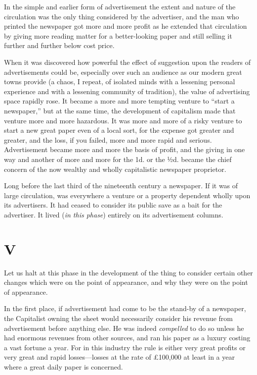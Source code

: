 \documentclass{book}
\begin{document}
In the simple and earlier form of advertisement the extent and nature of the circulation was the only thing considered by the advertiser, and the man who printed the newspaper got more and more profit as he extended that circulation by giving more reading matter for a better-looking paper and still selling it further and further below cost price.

When it was discovered how powerful the effect of suggestion upon the readers of advertisements could be, especially over such an audience as our modern great towns provide (a chaos, I repeat, of isolated minds with a lessening personal experience and with a lessening community of tradition), the value of advertising space rapidly rose. It became a more and more tempting venture to “start a newspaper,” but at the same time, the development of capitalism made that venture more and more hazardous. It was more and more of a risky venture to start a new great paper even of a local sort, for the expense got greater and greater, and the loss, if you failed, more and more rapid and serious. Advertisement became more and more the basis of profit, and the giving in one way and another of more and more for the 1d. or the ½d. became the chief concern of the now wealthy and wholly capitalistic newspaper proprietor.

Long before the last third of the nineteenth century a newspaper. If it was of large circulation, was everywhere a venture or a property dependent wholly upon its advertisers. It had ceased to consider its public save as a bait for the advertiser. It lived (\emph{in this phase}) entirely on its advertisement columns.

\chapter*{V}
\label{chapter-6}
Let us halt at this phase in the development of the thing to consider certain other changes which were on the point of appearance, and why they were on the point of appearance.

In the first place, if advertisement had come to be the stand-by of a newspaper, the Capitalist owning the sheet would necessarily consider his revenue from advertisement before anything else. He was indeed \emph{compelled} to do so unless he had enormous revenues from other sources, and ran his paper as a luxury costing a vast fortune a year. For in this industry the rule is either very great profits or very great and rapid losses—losses at the rate of £100,000 at least in a year where a great daily paper is concerned.
\end{document}
